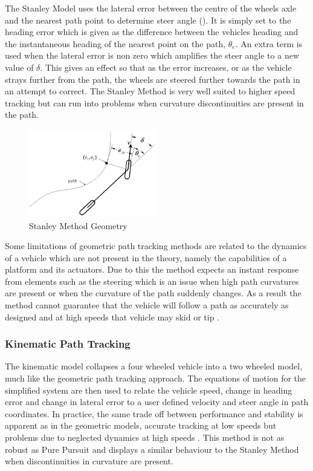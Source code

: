 \documentclass[main.tex]{subfiles}
\begin{document}
The Stanley Model uses the lateral error between the centre of the wheels axle and the nearest path point  to determine steer angle (). It is simply set to the heading error which is given as the difference between the vehicles heading and the instantaneous heading of the nearest point on the path, $\theta_e$. An extra term is used when the lateral error is non zero which amplifies the steer angle to a new value of $\delta$.  This gives an effect so that as the error increases, or as the vehicle strays further from the path, the wheels are steered further towards the path in an attempt to correct. The Stanley Method is very well suited to higher speed tracking but can run into problems when curvature discontinuities are present in the path.
\begin{figure}[ht]
\includegraphics[width=0.5\textwidth]{3-LiteratureReview/stanleyMethod.png}
\centering
\caption[Stanley Method Geometry]{Stanley Method Geometry \parencite{snider2009}} 
\end{figure}

Some limitations of geometric path tracking methods are related to the dynamics of a vehicle which are not present in the theory, namely the capabilities of a platform and its actuators. Due to this the method expects an instant response from elements such as the steering which is an issue when high path curvatures are present or when the curvature of the path suddenly changes. As a result the method cannot guarantee that the vehicle will follow a path as accurately as designed and at high speeds that vehicle may skid or tip \parencite{coulter1992}.

\subsubsection{Kinematic Path Tracking}
The kinematic model collapses a four wheeled vehicle into a two wheeled model, much like the geometric path tracking approach. The equations of motion for the simplified system are then used to relate the vehicle speed, change in heading error and change in lateral error to a user defined velocity and steer angle in path coordinates. In practice, the same trade off between performance and stability is apparent as in the geometric models, accurate tracking at low speeds but problems due to neglected dynamics at high speeds \parencite{snider2009}. This method is not as robust as Pure Pursuit and displays a similar behaviour to the Stanley Method when discontinuities in curvature are present.
\end{document}

